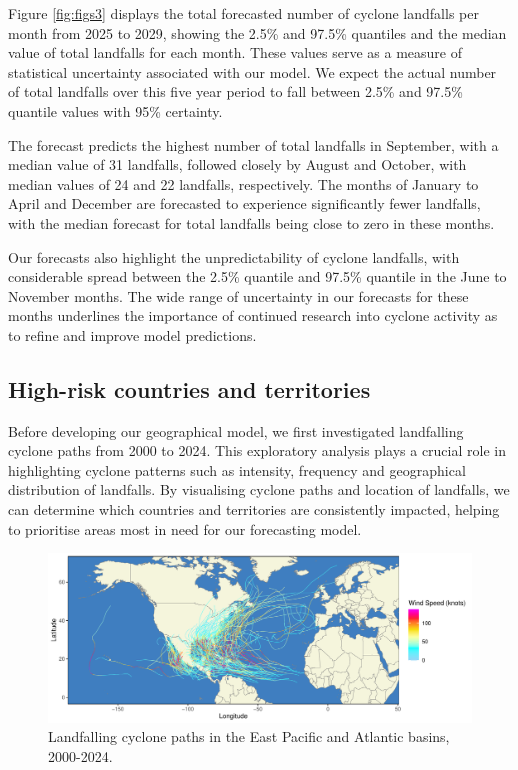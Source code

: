 \documentclass[
]{article}
\begin{document}
Figure \ref{fig:figs3} displays the total forecasted number of cyclone landfalls per month from 2025 to 2029, showing the 2.5\% and 97.5\% quantiles and the median value of total landfalls for each month. These values serve as a measure of statistical uncertainty associated with our model. We expect the actual number of total landfalls over this five year period to fall between 2.5\% and 97.5\% quantile values with 95\% certainty.

The forecast predicts the highest number of total landfalls in September, with a median value of 31 landfalls, followed closely by August and October, with median values of 24 and 22 landfalls, respectively. The months of January to April and December are forecasted to experience significantly fewer landfalls, with the median forecast for total landfalls being close to zero in these months.

Our forecasts also highlight the unpredictability of cyclone landfalls, with considerable spread between the 2.5\% quantile and 97.5\% quantile in the June to November months. The wide range of uncertainty in our forecasts for these months underlines the importance of continued research into cyclone activity as to refine and improve model predictions.

\subsection{High-risk countries and territories}\label{high-risk-countries-and-territories}

Before developing our geographical model, we first investigated landfalling cyclone paths from 2000 to 2024. This exploratory analysis plays a crucial role in highlighting cyclone patterns such as intensity, frequency and geographical distribution of landfalls. By visualising cyclone paths and location of landfalls, we can determine which countries and territories are consistently impacted, helping to prioritise areas most in need for our forecasting model.

\begin{figure}

{\centering \includegraphics{../outputs/eda-hurricane-data/landfall-map} 

}

\caption{Landfalling cyclone paths in the East Pacific and Atlantic basins, 2000-2024.}\label{fig:figs4}
\end{figure}
\end{document}
